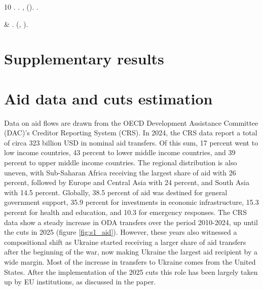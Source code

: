 \documentclass[fleqn,10pt,twocolumn]{wlscirep}
\begin{document}
\begin{thebibliography}{10}
.
\newblock {}.
\newblock {} ,  ().
\newblock {}.

 \& 
\newblock \emph{}.
\newblock {} (, ).

\end{thebibliography}



\clearpage

\renewcommand{\figurename}{Supplementary Figure}
\renewcommand{\tablename}{Supplementary Table}

\section*{Supplementary results}

\setcounter{figure}{0}
\setcounter{table}{0}

\appendix

\section{Aid data and cuts estimation}
\label{sec:aid_data_sm}

Data on aid flows are drawn from the OECD Development Assistance Committee (DAC)'s Creditor Reporting System (CRS). In 2024, the CRS data report a total of circa 323 billion USD in nominal aid transfers. Of this sum, 17 percent went to low income countries, 43 percent to lower middle income countries, and 39 percent to upper middle income countries. The regional distribution is also uneven, with Sub-Saharan Africa receiving the largest share of aid with 26 percent, followed by Europe and Central Asia with 24 percent, and South Asia with 14.5 percent. Globally, 38.5 percent of aid was destined for general government support, 35.9 percent for investments in economic infrastructure, 15.3 percent for health and education, and 10.3 for emergency responses. The CRS data show a steady increase in ODA transfers over the period 2010-2024, up until the cuts in 2025 (figure \ref{fig:s1_aid}). However, these years also witnessed a compositional shift as Ukraine started receiving a larger share of aid transfers after the beginning of the war, now making Ukraine the largest aid recipient by a wide margin. Most of the increase in transfers to Ukraine comes from the United States. After the implementation of the 2025 cuts this role has been largely taken up by EU institutions, as discussed in the paper. 
\end{document}
